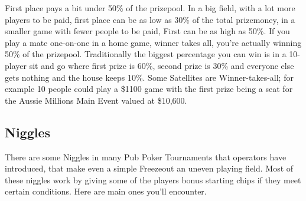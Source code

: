 First place pays a bit under 50\% of the prizepool. In a
big field, with a lot more players to be paid, first place can
be as low as 30\% of the total prizemoney, in a smaller game with
fewer people to be paid, First can be as high as 50\%. If you
play a mate one-on-one in a home game, winner takes all, you're
actually winning 50\% of the prizepool. Traditionally the biggest
percentage you can win is in a 10-player sit and go where first prize
is 60\%, second prize is 30\% and everyone else gets nothing and
the house keeps 10\%. Some Satellites are Winner-takes-all; for
example 10 people could play a \$1100 game with the first prize
being a seat for the Aussie Millions Main Event valued at \$10,600.


\subsection{Niggles}

There are some Niggles in many Pub Poker Tournaments that operators
have introduced, that make even a simple Freezeout an
uneven playing field. Most of these niggles work by giving some
of the players bonus starting chips if they meet certain
conditions. Here are main ones you'll encounter.


